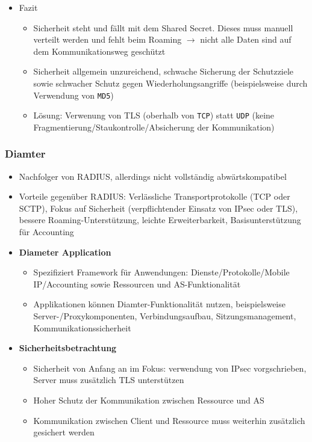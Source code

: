 \begin{itemize}
\begin{itemize}
		\item Fazit
		\begin{itemize}
			\item Sicherheit steht und fällt mit dem Shared Secret. Dieses muss manuell verteilt werden und fehlt beim Roaming \(\rightarrow\) nicht alle Daten sind auf dem Kommunikationsweg geschützt
			\item Sicherheit allgemein unzureichend, schwache Sicherung der Schutzziele sowie schwacher Schutz gegen Wiederholungsangriffe (beispielsweise durch Verwendung von \texttt{MD5})
			\item Lösung: Verwenung von TLS (oberhalb von \texttt{TCP}) statt \texttt{UDP} (keine Fragmentierung/Staukontrolle/Absicherung der Kommunikation)
		\end{itemize}
	\end{itemize}
\end{itemize}

\subsubsection{Diamter}
\begin{itemize}
	\item Nachfolger von RADIUS, allerdings nicht vollständig abwärtskompatibel
	\item Vorteile gegenüber RADIUS: Verlässliche Transportprotokolle (TCP oder SCTP), Fokus auf Sicherheit (verpflichtender Einsatz von IPsec oder TLS), bessere Roaming-Unterstützung, leichte Erweiterbarkeit, Basisunterstützung für Accounting
	\item \textbf{Diameter Application}
	\begin{itemize}
		\item Spezifiziert Framework für Anwendungen: Dienste/Protokolle/Mobile IP/Accounting sowie Ressourcen und AS-Funktionalität
		\item Applikationen können Diamter-Funktionalität nutzen, beispielsweise Server-/Proxykomponenten, Verbindungsaufbau, Sitzungsmanagement, Kommunikationssicherheit
	\end{itemize}
	\item \textbf{Sicherheitsbetrachtung}
	\begin{itemize}
		\item Sicherheit von Anfang an im Fokus: verwendung von IPsec vorgschrieben, Server muss zusätzlich TLS unterstützen
		\item Hoher Schutz der Kommunikation zwischen Ressource und AS
		\item Kommunikation zwischen Client und Ressource muss weiterhin zusätzlich gesichert werden
	\end{itemize}
\end{itemize}



